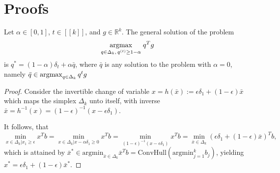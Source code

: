 \appendix
\section{Proofs}
\label{sec:proofs}
\begin{lemma}
Let  $\alpha \in [0, 1]$, $t \in [\![k]\!]$, and $g \in \mathbb R^k$. The
general solution of the problem
\begin{eqnarray}
  \underset{q \in \Delta_k,\, q^{(t)} \ge 1-\alpha}{\operatorname{argmax}}\; q^Tg
\end{eqnarray}
is $q^*=(1-\alpha) \delta_t + \alpha\bar{q}$, where $\bar{q}$ is any solution to
the problem with $\alpha=0$, namely $\bar{q} \in \operatorname{argmax}_{q \in \Delta_k}q^tg$
\label{thm:bumbednash}
\end{lemma}
\begin{proof}
Consider the invertible change of variable $x = h(\bar{x}):=\epsilon\delta_1 +
(1-\epsilon)\bar{x}$ which maps the simplex $\Delta_k$ unto itself, with inverse
$\bar{x} = h^{-1}(x)=(1-\epsilon)^{-1}(x-\epsilon\delta_1)$.

It follows, that
$$
\min_{x \in \Delta_k | x_1 \ge \epsilon}x^Tb=\min_{x \in \Delta_k |
  x-\alpha\delta_1 \ge
  0}x^Tb=\min_{(1-\epsilon)^{-1}(x-\epsilon\delta_1)}x^Tb=\min_{\bar{x} \in
  \Delta_k}(\epsilon\delta_1+(1-\epsilon)\bar{x})^Tb,
$$
which is attained by $\bar{x}^* \in \text{argmin}_{\bar{x} \in
  \Delta_k}\bar{x}^Tb=\text{ConvHull}(\text{argmin}_{j=1}^k b_j)$, yielding $
x^*=\epsilon\delta_1 + (1-\epsilon)\bar{x}^*$.
\end{proof}
